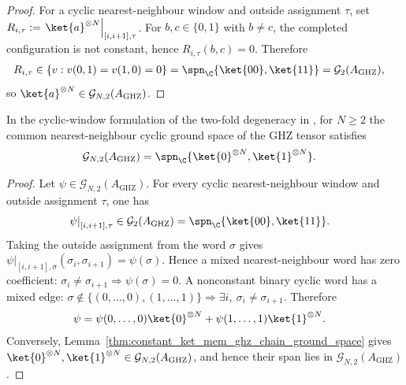 \begin{proof}
    \leanok
    For a cyclic nearest-neighbour window and outside assignment $\tau$, set
    $R_{i,\tau}:=\left.\ket{a}^{\otimes N}\right|_{[i,i+1],\tau}$.
    For $b,c\in\{0,1\}$ with $b\ne c$, the completed configuration is not
    constant, hence $R_{i,\tau}(b,c)=0$. Therefore
    \begin{align}
        R_{i,\tau}
         & \in
        \{v:v(0,1)=v(1,0)=0\}
        =
        \spn_{\C}\{\ket{00},\ket{11}\}
        =
        \mathcal G_2(A_{\mathrm{GHZ}}),
        \notag
    \end{align}
    so $\ket{a}^{\otimes N}\in\mathcal G_{N,2}(A_{\mathrm{GHZ}})$.
\end{proof}

\begin{lemma}
    \label{thm:ghz_chain_ground_space_two}
    \leanok
    In the cyclic-window formulation of the two-fold degeneracy in
    \cite[line~2205]{Cirac2021Matrix}, for $N\ge2$ the common
    nearest-neighbour cyclic ground space of the GHZ tensor satisfies
    \begin{align}
        \mathcal G_{N,2}(A_{\mathrm{GHZ}})
         & =
        \spn_{\C}\{
        \ket{0}^{\otimes N},
        \ket{1}^{\otimes N}
        \}.
        \notag
    \end{align}
\end{lemma}

\begin{proof}
    \leanok
    Let $\psi\in\mathcal G_{N,2}(A_{\mathrm{GHZ}})$. For every cyclic
    nearest-neighbour window and outside assignment $\tau$, one has
    \begin{align}
        \left.\psi\right|_{[i,i+1],\tau}
         & \in
        \mathcal G_2(A_{\mathrm{GHZ}})
        =
        \spn_{\C}\{\ket{00},\ket{11}\}.
        \notag
    \end{align}
    Taking the outside assignment from the word $\sigma$ gives
    $\left.\psi\right|_{[i,i+1],\sigma}
        (\sigma_i,\sigma_{i+1})=\psi(\sigma)$.
    Hence a mixed nearest-neighbour word has zero coefficient:
    $\sigma_i\ne\sigma_{i+1}\Longrightarrow\psi(\sigma)=0$.
    A nonconstant binary cyclic word has a mixed edge:
    $\sigma\notin\{(0,\ldots,0),(1,\ldots,1)\}
        \Longrightarrow\exists i,\ \sigma_i\ne\sigma_{i+1}$.
    Therefore
    \begin{align}
        \psi
         & =
        \psi(0,\ldots,0)\ket{0}^{\otimes N}
        +
        \psi(1,\ldots,1)\ket{1}^{\otimes N}.
        \notag
    \end{align}
    Conversely, Lemma~\ref{thm:constant_ket_mem_ghz_chain_ground_space}
    gives
    $\ket{0}^{\otimes N},\ket{1}^{\otimes N}
        \in\mathcal G_{N,2}(A_{\mathrm{GHZ}})$, and hence their span lies in
    $\mathcal G_{N,2}(A_{\mathrm{GHZ}})$.
\end{proof}


